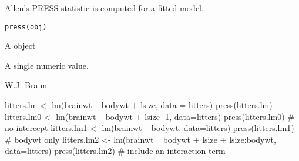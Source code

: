 \begin{Description}\relax
Allen's PRESS statistic is computed for a fitted model.
\end{Description}
\begin{Usage}
\begin{verbatim}
press(obj)
\end{verbatim}
\end{Usage}
\begin{Arguments}
\begin{ldescription}
\item[\code{obj}] A  object 
\end{ldescription}
\end{Arguments}
\begin{Value}
A single numeric value.
\end{Value}
\begin{Author}\relax
W.J. Braun
\end{Author}
\begin{SeeAlso}\relax
{}
\end{SeeAlso}
\begin{Examples}
\begin{ExampleCode}
litters.lm <- lm(brainwt ~ bodywt + lsize, data = litters)
press(litters.lm)
litters.lm0 <- lm(brainwt ~ bodywt + lsize -1, data=litters)
press(litters.lm0) # no intercept
litters.lm1 <- lm(brainwt ~ bodywt, data=litters)
press(litters.lm1) # bodywt only
litters.lm2 <- lm(brainwt ~ bodywt + lsize + lsize:bodywt, data=litters)
press(litters.lm2) # include an interaction term
\end{ExampleCode}
\end{Examples}

